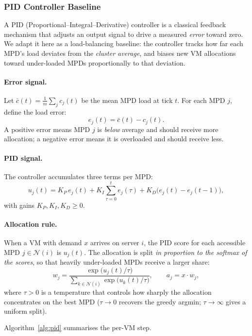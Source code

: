 \documentclass[11pt]{article}
\begin{document}
\subsubsection*{PID Controller Baseline}

A PID (Proportional--Integral--Derivative) controller is a classical
feedback mechanism that adjusts an output signal to drive a measured
\emph{error} toward zero.  We adapt it here as a load-balancing baseline:
the controller tracks how far each MPD's load deviates from the
\emph{cluster average}, and biases new VM allocations toward under-loaded
MPDs proportionally to that deviation.

\paragraph{Error signal.}
Let $\bar{c}(t) = \frac{1}{m}\sum_j c_j(t)$ be the mean MPD load at tick
$t$.  For each MPD $j$, define the load error:
\[
    e_j(t) = \bar{c}(t) - c_j(t).
\]
A positive error means MPD $j$ is \emph{below} average and should receive
more allocation; a negative error means it is overloaded and should receive
less.

\paragraph{PID signal.}
The controller accumulates three terms per MPD:
\[
    u_j(t) = K_P\, e_j(t)
           + K_I \sum_{\tau=0}^{t} e_j(\tau)
           + K_D \bigl(e_j(t) - e_j(t-1)\bigr),
\]
with gains $K_P, K_I, K_D \ge 0$.

\paragraph{Allocation rule.}
When a VM with demand $x$ arrives on server $i$, the PID score for each
accessible MPD $j \in \mathcal{N}(i)$ is $u_j(t)$.  The allocation is
split \emph{in proportion to the softmax of the scores}, so that heavily
under-loaded MPDs receive a larger share:
\[
    w_j = \frac{\exp\!\bigl(u_j(t) / \tau\bigr)}
               {\sum_{k \in \mathcal{N}(i)} \exp\!\bigl(u_k(t) / \tau\bigr)},
    \qquad
    a_j = x \cdot w_j,
\]
where $\tau > 0$ is a temperature that controls how sharply the allocation
concentrates on the best MPD ($\tau \to 0$ recovers the greedy argmin;
$\tau \to \infty$ gives a uniform split).

Algorithm~\ref{alg:pid} summarises the per-VM step.
\end{document}
